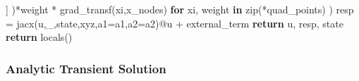 \documentclass[
  11pt,
]{article}
\newenvironment{Shaded}{}{}
\newcommand{\BuiltInTok}[1]{#1}
\newcommand{\ControlFlowTok}[1]{\textcolor[rgb]{0.00,0.44,0.13}{\textbf{#1}}}
\newcommand{\KeywordTok}[1]{\textcolor[rgb]{0.00,0.44,0.13}{\textbf{#1}}}
\newcommand{\NormalTok}[1]{#1}
\newcommand{\OperatorTok}[1]{\textcolor[rgb]{0.40,0.40,0.40}{#1}}
\begin{document}
\begin{Shaded}
\begin{Highlighting}[]
\NormalTok{              ]}
\NormalTok{            )}\OperatorTok{*}\NormalTok{weight }\OperatorTok{*}\NormalTok{ grad\_transf(xi,x\_nodes) }\ControlFlowTok{for}\NormalTok{ xi, weight }\KeywordTok{in} \BuiltInTok{zip}\NormalTok{(}\OperatorTok{*}\NormalTok{quad\_points)}
\NormalTok{        )}
\NormalTok{        resp }\OperatorTok{=}\NormalTok{ jacx(u,\_,state,xyz,a1}\OperatorTok{=}\NormalTok{a1,a2}\OperatorTok{=}\NormalTok{a2)}\OperatorTok{@}\NormalTok{u }\OperatorTok{+}\NormalTok{ external\_term}
        \ControlFlowTok{return}\NormalTok{ u, resp, state}
    \ControlFlowTok{return} \BuiltInTok{locals}\NormalTok{()}
\end{Highlighting}
\end{Shaded}

\newpage{}

\hypertarget{analytic-transient-solution}{%
\subsubsection{Analytic Transient
Solution}\label{analytic-transient-solution}}
\end{document}
